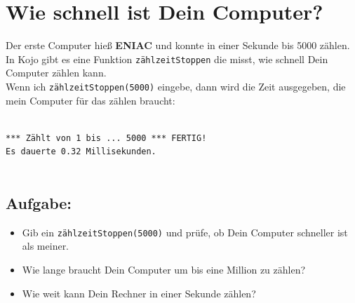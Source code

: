 \chapter{Wie schnell ist Dein Computer?}Der erste Computer hieß {\bf ENIAC} und konnte in einer Sekunde bis 5000 zählen.\\
In Kojo gibt es eine Funktion \lstinline{zählzeitStoppen} die misst, wie schnell Dein Computer zählen kann.\\
Wenn ich \lstinline{zählzeitStoppen(5000)} eingebe, dann wird die Zeit ausgegeben, die mein Computer für das zählen braucht:

\begin{lstlisting}[numbers=none]

*** Zählt von 1 bis ... 5000 *** FERTIG!
Es dauerte 0.32 Millisekunden.
      
\end{lstlisting}
        
\section*{\color{BrickRed}Aufgabe:}


\begin{itemize}

\item {Gib ein \lstinline{zählzeitStoppen(5000)} und prüfe, ob Dein Computer schneller ist als meiner.}
\item {Wie lange braucht Dein Computer um bis eine Million zu zählen?}
\item {Wie weit kann Dein Rechner in einer Sekunde zählen?}

\end{itemize}



